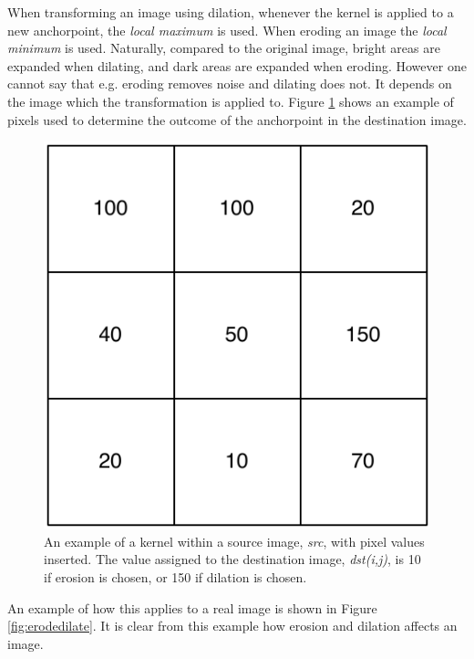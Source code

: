 When transforming an image using dilation, whenever the kernel is applied to a new anchorpoint, the \textit{local maximum} is used\cite{theory1}. When eroding an image the \textit{local minimum} is used\cite{theory1}. Naturally, compared to the original image, bright areas are expanded when dilating, and dark areas are expanded when eroding. However one cannot say that e.g. eroding removes noise and dilating does not. It depends on the image which the transformation is applied to. Figure \ref{fig:sample_kernel} shows an example of pixels used to determine the outcome of the anchorpoint in the destination image. \\

\begin{figure}[ht!]
  \centering
    \includegraphics[scale=0.50]{img/sample_kernel.pdf}
  \caption{An example of a kernel within a source image, \emph{src}, with pixel values inserted. The value assigned to the destination image, \emph{dst(i,j)}, is 10 if erosion is chosen, or 150 if dilation is chosen.}
  \label{fig:sample_kernel}
\end{figure}

An example of how this applies to a real image is shown in Figure \ref{fig:erodedilate}. It is clear from this example how erosion and dilation affects an image.\\

